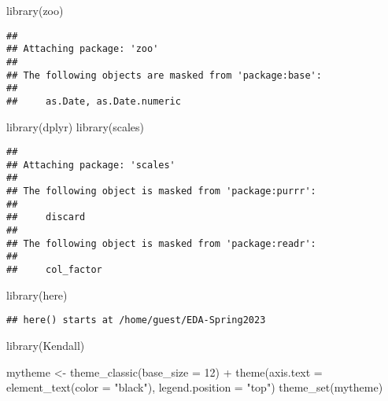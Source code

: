 \documentclass[
]{article}
\newenvironment{Shaded}{\begin{snugshade}}{\end{snugshade}}
\newcommand{\AttributeTok}[1]{\textcolor[rgb]{0.77,0.63,0.00}{#1}}
\newcommand{\DecValTok}[1]{\textcolor[rgb]{0.00,0.00,0.81}{#1}}
\newcommand{\FunctionTok}[1]{\textcolor[rgb]{0.00,0.00,0.00}{#1}}
\newcommand{\NormalTok}[1]{#1}
\newcommand{\OtherTok}[1]{\textcolor[rgb]{0.56,0.35,0.01}{#1}}
\newcommand{\SpecialCharTok}[1]{\textcolor[rgb]{0.00,0.00,0.00}{#1}}
\newcommand{\StringTok}[1]{\textcolor[rgb]{0.31,0.60,0.02}{#1}}
\begin{document}
\begin{Shaded}
\begin{Highlighting}[]
\FunctionTok{library}\NormalTok{(zoo)}
\end{Highlighting}
\end{Shaded}

\begin{verbatim}
## 
## Attaching package: 'zoo'
## 
## The following objects are masked from 'package:base':
## 
##     as.Date, as.Date.numeric
\end{verbatim}

\begin{Shaded}
\begin{Highlighting}[]
\FunctionTok{library}\NormalTok{(dplyr)}
\FunctionTok{library}\NormalTok{(scales)}
\end{Highlighting}
\end{Shaded}

\begin{verbatim}
## 
## Attaching package: 'scales'
## 
## The following object is masked from 'package:purrr':
## 
##     discard
## 
## The following object is masked from 'package:readr':
## 
##     col_factor
\end{verbatim}

\begin{Shaded}
\begin{Highlighting}[]
\FunctionTok{library}\NormalTok{(here)}
\end{Highlighting}
\end{Shaded}

\begin{verbatim}
## here() starts at /home/guest/EDA-Spring2023
\end{verbatim}

\begin{Shaded}
\begin{Highlighting}[]
\FunctionTok{library}\NormalTok{(Kendall)}

\NormalTok{mytheme }\OtherTok{\textless{}{-}} \FunctionTok{theme\_classic}\NormalTok{(}\AttributeTok{base\_size =} \DecValTok{12}\NormalTok{) }\SpecialCharTok{+}
  \FunctionTok{theme}\NormalTok{(}\AttributeTok{axis.text =} \FunctionTok{element\_text}\NormalTok{(}\AttributeTok{color =} \StringTok{"black"}\NormalTok{), }
        \AttributeTok{legend.position =} \StringTok{"top"}\NormalTok{)}
\FunctionTok{theme\_set}\NormalTok{(mytheme)}
\end{Highlighting}
\end{Shaded}
\end{document}

